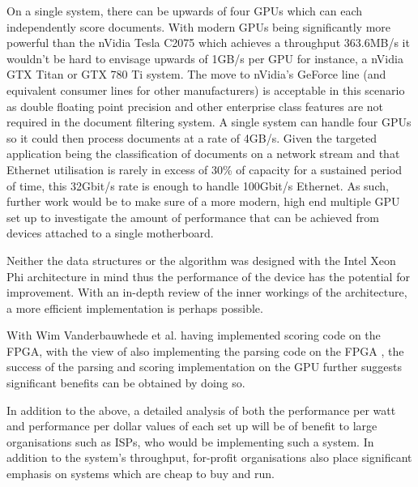 On a single system, there can be upwards of four GPUs which can each
independently score documents. With modern GPUs being significantly more
powerful than the nVidia Tesla C2075 which achieves a throughput 363.6MB/s it
wouldn't be hard to envisage upwards of 1GB/s per GPU for instance, a nVidia GTX
Titan or GTX 780 Ti system. The move to nVidia's GeForce line (and equivalent
consumer lines for other manufacturers) is acceptable in this scenario as double
floating point precision and other enterprise class features are not required in
the document filtering system. A single system can handle four GPUs so it could
then process documents at a rate of 4GB/s. Given the targeted application being
the classification of documents on a network stream and that Ethernet
utilisation is rarely in excess of 30\% of capacity for a sustained period of
time, this 32Gbit/s rate is enough to handle 100Gbit/s Ethernet. As such,
further work would be to make sure of a more modern, high end multiple GPU set
up to investigate the amount of performance that can be achieved from devices
attached to a single motherboard.

Neither the data structures or the algorithm was designed with the Intel Xeon
Phi architecture in mind thus the performance of the device has the potential
for improvement. With an in-depth review of the inner workings of the
architecture, a more efficient implementation is perhaps possible.

With Wim Vanderbauwhede et al. having implemented scoring code on the FPGA, with
the view of also implementing the parsing code on the FPGA \cite{HybridCPUFPGA},
the success of the parsing and scoring implementation on the GPU further
suggests significant benefits can be obtained by doing so.

In addition to the above, a detailed analysis of both the performance per watt
and performance per dollar values of each set up will be of benefit to large
organisations such as ISPs, who would be implementing such a system. In addition
to the system's throughput, for-profit organisations also place significant
emphasis on systems which are cheap to buy and run.
